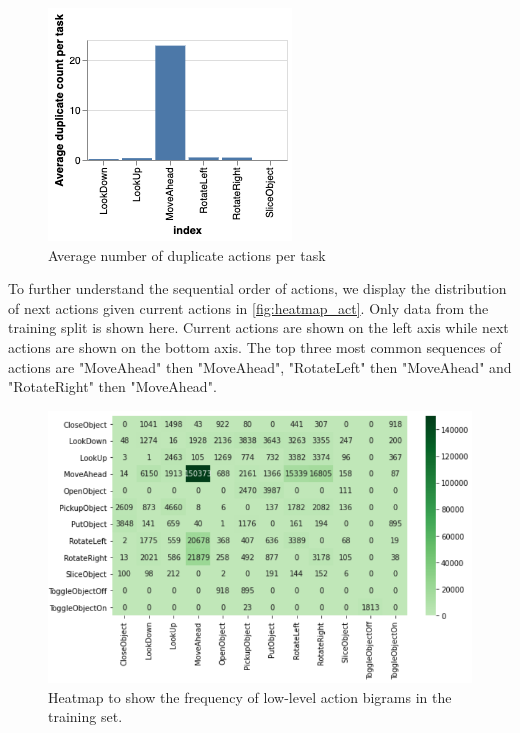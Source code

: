 \documentclass[11pt,a4paper]{article}
\begin{document}
\begin{figure}
    \centering
    \includegraphics[width=\linewidth]{Reports/1-Task-Definition-and-Data/duplicate_distrib.png}
    \caption{Average number of duplicate actions per task}
    \label{fig:duplicate_dist}
\end{figure}

To further understand the sequential order of actions, we display the distribution of next actions given current actions in \autoref{fig:heatmap_act}. Only data from the training split is shown here. Current actions are shown on the left axis while next actions are shown on the bottom axis. The top three most common sequences of actions are "MoveAhead" then "MoveAhead", "RotateLeft" then "MoveAhead" and "RotateRight" then "MoveAhead".
\begin{figure}
    \centering
    \includegraphics[width=\linewidth]{Reports/1-Task-Definition-and-Data/heatmap_actions.png}
    \caption{Heatmap to show the frequency of low-level action bigrams in the training set.}
    \label{fig:heatmap_act}
\end{figure}
\end{document}
